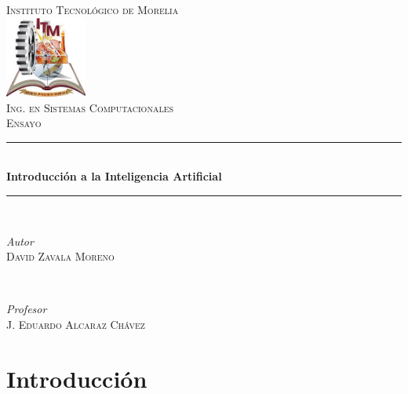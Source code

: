 \documentclass[12pt]{article}
\begin{document}
\begin{titlepage}
	\newcommand{\HRule}{\rule{\linewidth}{0.5mm}} 
	
	\center 
	
	
	
	\textsc{\LARGE Instituto Tecnológico de Morelia }\\[1.5cm] 
    
    \includegraphics[width=0.2\textwidth]{descarga.jpg}\\[1cm] 
	
	\textsc{\Large Ing. en Sistemas Computacionales}\\[0.5cm] 
	
	\textsc{\large Ensayo }\\[0.5cm] 
	
	
	
	\HRule\\[0.4cm]
	
	{\huge\bfseries Introducción a la Inteligencia Artificial}\\[0.4cm]
	
	\HRule\\[1.5cm]
	
	
	
	\begin{minipage}{0.4\textwidth}
		\begin{flushleft}
			\large
			\textit{Autor}\\
		    \textsc{David Zavala Moreno} 
		\end{flushleft}
	\end{minipage}
	~
	\begin{minipage}{0.5\textwidth}
		\begin{flushright}
			\large
			\textit{Profesor}\\
			\textsc{J. Eduardo Alcaraz Chávez}
		\end{flushright}
	\end{minipage}
  
\end{titlepage}

\newpage
\newpage
\tableofcontents 
\newpage

\section{Introducción}
\end{document}
